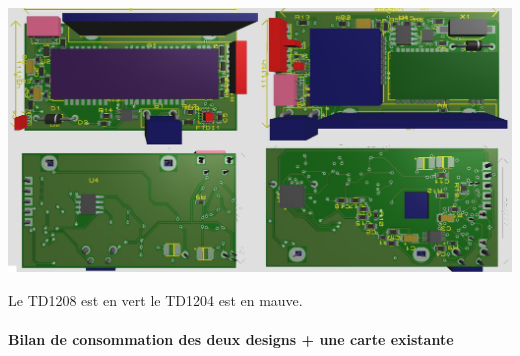 \documentclass[10pt,a4paper]{article}
\begin{document}
\includegraphics[scale=0.2]{TP1204-1208.png} 

Le TD1208 est en vert le TD1204 est en mauve. 


\paragraph{Bilan de consommation des deux designs + une carte existante}
\end{document}
